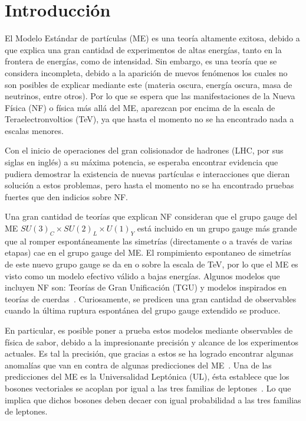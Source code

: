 \chapter{Introducci\'{o}n}
El Modelo Estándar de partículas (ME) es una teoría altamente exitosa, debido a que explica una gran cantidad de experimentos de altas energías, tanto en la frontera de energías, como de intensidad. Sin embargo, es una teoría que se considera incompleta, debido a la aparición de nuevos fenómenos los cuales no son posibles de explicar mediante este (materia oscura, energía oscura, masa de neutrinos, entre otros). Por lo que se espera que las manifestaciones de la Nueva Física (NF) o física más allá del ME, aparezcan por encima de la escala de Teraelectronvoltios (TeV), ya que hasta el momento no se ha encontrado nada a escalas menores. 

Con el inicio de operaciones del gran colisionador de hadrones (LHC, por sus siglas en inglés) a su máxima potencia, se esperaba encontrar evidencia que pudiera demostrar la existencia de nuevas partículas e interacciones que dieran solución a estos problemas, pero hasta el momento no se ha encontrado pruebas fuertes que den indicios sobre NF.

Una gran cantidad de teorías que explican NF consideran que el grupo gauge del ME $SU(3)_C \times SU(2)_L \times U(1)_Y$ está incluido en un grupo gauge más grande que al romper espontáneamente las simetrías (directamente o a través de varias etapas) cae en el grupo gauge del ME. El rompimiento espontaneo de simetrías de este nuevo grupo gauge se da en o sobre la escala de TeV, por lo que el ME es visto como un modelo efectivo válido a bajas energías. Algunos modelos que incluyen NF son: Teorías de Gran Unificación (TGU) y modelos inspirados en teorías de cuerdas~\cite{Faber:2018qon}. Curiosamente, se predicen una gran cantidad de observables cuando la última ruptura espontánea del grupo gauge extendido se produce. 

En particular, es posible poner a prueba estos modelos mediante observables de física de sabor, debido a la impresionante precisión y alcance de los experimentos actuales. Es tal la precisión, que gracias a estos se ha logrado encontrar algunas anomalías que van en contra de algunas predicciones del ME~\cite{Amhis:2014hma}. Una de las predicciones del ME es la Universalidad Leptónica (UL), ésta establece que los bosones vectoriales se acoplan por igual a las tres familias de leptones~\cite{Abazov:2007wy}. Lo que implica que dichos bosones deben decaer con igual probabilidad a las tres familias de leptones. 

